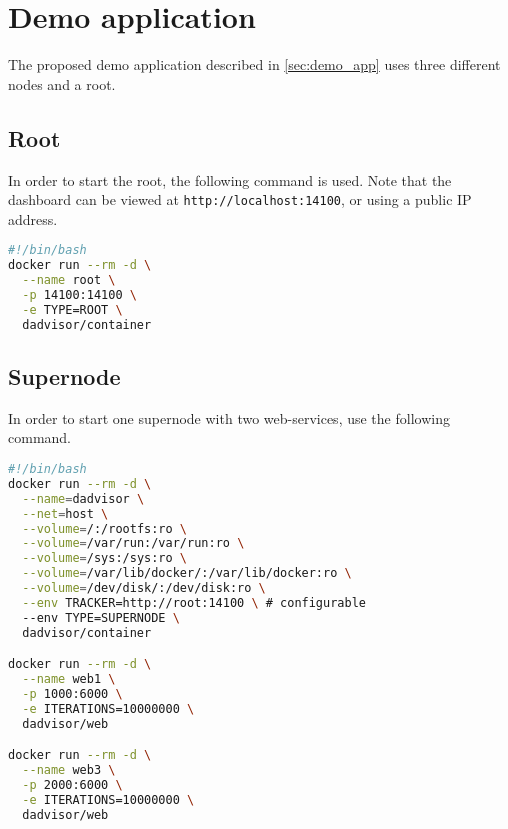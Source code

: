 \chapter{Demo application} 
\label{ch:demo_application}
The proposed demo application described in \autoref{sec:demo_app} uses three different nodes and a root.

\section{Root}
In order to start the root, the following command is used. Note that the dashboard can be viewed at \texttt{http://localhost:14100}, or using a public IP address.

\begin{lstlisting}[language=bash, caption={Root command}]
#!/bin/bash
docker run --rm -d \
  --name root \
  -p 14100:14100 \
  -e TYPE=ROOT \
  dadvisor/container
\end{lstlisting}

\section{Supernode} \label{sec:deploy_supernode}
In order to start one supernode with two web-services, use the following command.

\begin{lstlisting}[language=bash, caption={Supernode command}]
#!/bin/bash
docker run --rm -d \
  --name=dadvisor \
  --net=host \
  --volume=/:/rootfs:ro \
  --volume=/var/run:/var/run:ro \
  --volume=/sys:/sys:ro \
  --volume=/var/lib/docker/:/var/lib/docker:ro \
  --volume=/dev/disk/:/dev/disk:ro \
  --env TRACKER=http://root:14100 \ # configurable
  --env TYPE=SUPERNODE \
  dadvisor/container

docker run --rm -d \
  --name web1 \
  -p 1000:6000 \
  -e ITERATIONS=10000000 \
  dadvisor/web

docker run --rm -d \
  --name web3 \
  -p 2000:6000 \
  -e ITERATIONS=10000000 \
  dadvisor/web
\end{lstlisting}

